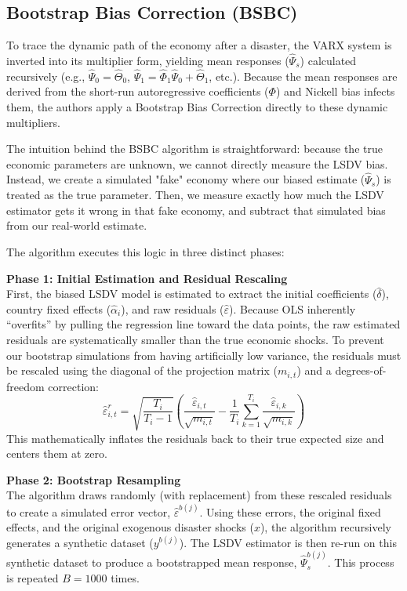 \documentclass[11pt, a4paper]{article}
\begin{document}
\subsection{Bootstrap Bias Correction (BSBC)}
To trace the dynamic path of the economy after a disaster, the VARX system is inverted into its multiplier form, yielding mean responses ($\hat{\Psi}_s$) calculated recursively (e.g., $\hat{\Psi}_0 = \hat{\Theta}_0$, $\hat{\Psi}_1 = \hat{\Phi}_1\hat{\Psi}_0 + \hat{\Theta}_1$, etc.). Because the mean responses are derived from the short-run autoregressive coefficients ($\Phi$) and Nickell bias infects them, the authors apply a Bootstrap Bias Correction directly to these dynamic multipliers.

The intuition behind the BSBC algorithm is straightforward: because the true economic parameters are unknown, we cannot directly measure the LSDV bias. Instead, we create a simulated "fake" economy where our biased estimate ($\hat{\Psi}_s$) is treated as the true parameter. Then, we measure exactly how much the LSDV estimator gets it wrong in that fake economy, and subtract that simulated bias from our real-world estimate. 

The algorithm executes this logic in three distinct phases:
\vspace{1mm}

\textbf{Phase 1: Initial Estimation and Residual Rescaling} \\
First, the biased LSDV model is estimated to extract the initial coefficients ($\hat{\delta}$), country fixed effects ($\hat{\alpha}_i$), and raw residuals ($\hat{\varepsilon}$). Because OLS inherently ``overfits'' by pulling the regression line toward the data points, the raw estimated residuals are systematically smaller than the true economic shocks. To prevent our bootstrap simulations from having artificially low variance, the residuals must be rescaled using the diagonal of the projection matrix ($m_{i,t}$) and a degrees-of-freedom correction:
\begin{equation}
    \hat{\varepsilon}^r_{i,t} = \sqrt{\frac{T_i}{T_i - 1}} \left( \frac{\hat{\varepsilon}_{i,t}}{\sqrt{m_{i,t}}} - \frac{1}{T_i}\sum_{k=1}^{T_i}\frac{\hat{\varepsilon}_{i,k}}{\sqrt{m_{i,k}}} \right)
\end{equation}
This mathematically inflates the residuals back to their true expected size and centers them at zero.
\vspace{1mm}

\textbf{Phase 2: Bootstrap Resampling} \\
The algorithm draws randomly (with replacement) from these rescaled residuals to create a simulated error vector, $\hat{\varepsilon}^{b(j)}$. Using these errors, the original fixed effects, and the original exogenous disaster shocks ($x$), the algorithm recursively generates a synthetic dataset ($y^{b(j)}$). The LSDV estimator is then re-run on this synthetic dataset to produce a bootstrapped mean response, $\hat{\Psi}_s^{b(j)}$. This process is repeated $B = 1000$ times.
\vspace{1mm}
\end{document}
